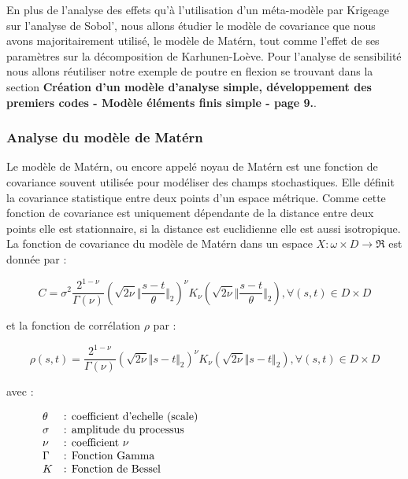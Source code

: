 \documentclass[a4paper,10pt]{article}
\begin{document}
	En plus de l'analyse des effets qu'à l'utilisation d'un méta-modèle par Krigeage sur l'analyse de Sobol', nous allons étudier le modèle de covariance que nous avons majoritairement utilisé, le modèle de Matérn, tout comme l'effet de ses paramètres sur la décomposition de Karhunen-Loève. Pour l'analyse de sensibilité nous allons réutiliser notre exemple de poutre en flexion se trouvant dans la section \textbf{Création d'un modèle d'analyse simple, développement des premiers codes - Modèle éléments finis simple - page 9.}. 
	
	\subsubsection{Analyse du modèle de Matérn}
	 
	Le modèle de Matérn, ou encore appelé noyau de Matérn est une fonction de covariance souvent utilisée pour modéliser des champs stochastiques. Elle définit la covariance statistique entre deux points d'un espace métrique. Comme cette fonction de covariance est uniquement dépendante de la distance entre deux points elle est stationnaire, si la distance est euclidienne elle est aussi isotropique. \\
	
	La fonction de covariance du modèle de Matérn dans un espace $X : \omega \times D \rightarrow \Re $ est donnée par : 
	
	\begin{equation}
	C = \sigma^{2}\frac{2^{1-\nu}}{\Gamma(\nu)}\left(\sqrt{2\nu}\Vert\frac{s-t}{\theta}\Vert_{2}\right)^{\nu} K_{\nu} \left(\sqrt{2\nu}\Vert\frac{s-t}{\theta}\Vert_{2}\right) , \forall(s,t) \in D \times D
	\end{equation}
	
	et la fonction de corrélation $ \rho $ par : 
	
	\begin{equation}
	\rho(s,t) = \frac{2^{1-\nu}}{\Gamma(\nu)}\left(\sqrt{2\nu}\Vert s-t \Vert_{2}\right)^{\nu} K_{\nu} \left(\sqrt{2\nu}\Vert s-t \Vert_{2}\right) , \forall(s,t) \in D \times D
	\end{equation}

	avec :
	
   \[
      \begin{array}{lp{0.8\linewidth}}	
	    \theta & : coefficient d'echelle (scale) \\
	    \sigma & : amplitude du processus \\
		\nu    & : coefficient $\nu$ 	\\
		\Gamma & : Fonction Gamma \\
		K      & : Fonction de Bessel
      \end{array}
   \]	
\end{document}
